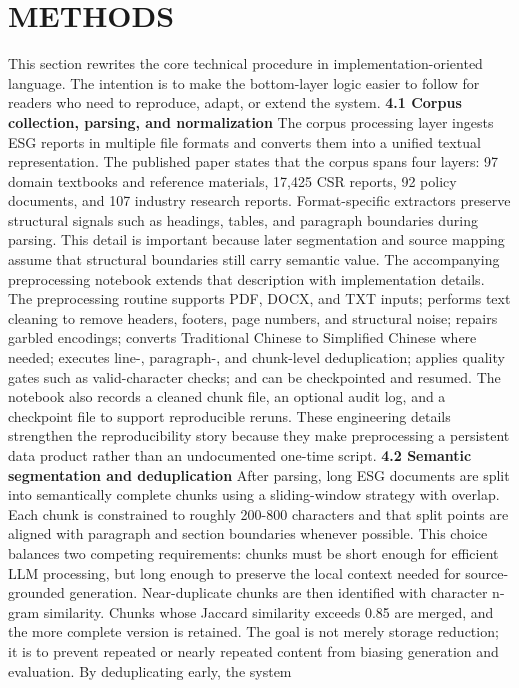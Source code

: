 \documentclass[9pt,twocolumn]{extarticle}
\begin{document}
\section{METHODS}
This section rewrites the core technical procedure in
implementation-oriented language. The intention is to make the
bottom-layer logic easier to follow for readers who need to reproduce,
adapt, or extend the system.
\textbf{4.1 Corpus collection, parsing, and normalization}
The corpus processing layer ingests ESG reports in multiple file formats
and converts them into a unified textual representation. The published
paper states that the corpus spans four layers: 97 domain textbooks and
reference materials, 17,425 CSR reports, 92 policy documents, and 107
industry research reports. Format-specific extractors preserve
structural signals such as headings, tables, and paragraph boundaries
during parsing. This detail is important because later segmentation and
source mapping assume that structural boundaries still carry semantic
value.
The accompanying preprocessing notebook extends that description with
implementation details. The preprocessing routine supports PDF, DOCX,
and TXT inputs; performs text cleaning to remove headers, footers, page
numbers, and structural noise; repairs garbled encodings; converts
Traditional Chinese to Simplified Chinese where needed; executes line-,
paragraph-, and chunk-level deduplication; applies quality gates such as
valid-character checks; and can be checkpointed and resumed. The
notebook also records a cleaned chunk file, an optional audit log, and a
checkpoint file to support reproducible reruns. These engineering
details strengthen the reproducibility story because they make
preprocessing a persistent data product rather than an undocumented
one-time script.
\textbf{4.2 Semantic segmentation and deduplication}
After parsing, long ESG documents are split into semantically complete
chunks using a sliding-window strategy with overlap. Each chunk is
constrained to roughly 200-800 characters and that split points are
aligned with paragraph and section boundaries whenever possible. This
choice balances two competing requirements: chunks must be short enough
for efficient LLM processing, but long enough to preserve the local
context needed for source-grounded generation.
Near-duplicate chunks are then identified with character n-gram
similarity. Chunks whose Jaccard similarity exceeds 0.85 are merged, and
the more complete version is retained. The goal is not merely storage
reduction; it is to prevent repeated or nearly repeated content from
biasing generation and evaluation. By deduplicating early, the system
\end{document}
